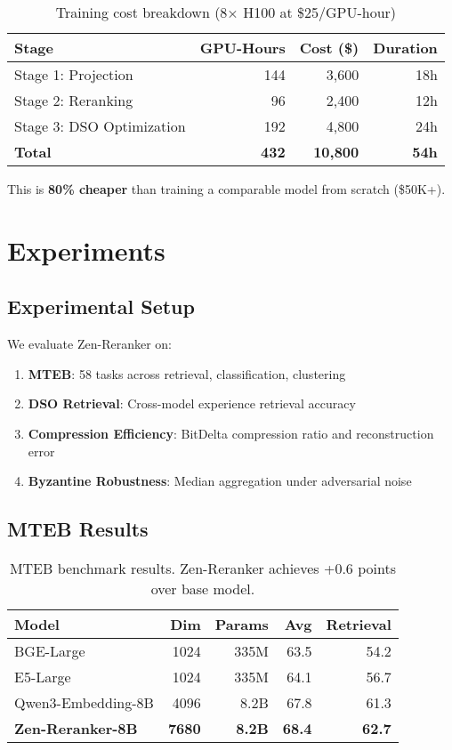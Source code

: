\documentclass[11pt,letterpaper]{article}
\begin{document}
\begin{table}[h]
\centering
\begin{tabular}{lrrr}
\toprule
\textbf{Stage} & \textbf{GPU-Hours} & \textbf{Cost (\$)} & \textbf{Duration} \\
\midrule
Stage 1: Projection & 144 & 3,600 & 18h \\
Stage 2: Reranking & 96 & 2,400 & 12h \\
Stage 3: DSO Optimization & 192 & 4,800 & 24h \\
\midrule
\textbf{Total} & \textbf{432} & \textbf{10,800} & \textbf{54h} \\
\bottomrule
\end{tabular}
\caption{Training cost breakdown (8× H100 at \$25/GPU-hour)}
\end{table}

This is \textbf{80\% cheaper} than training a comparable model from scratch (\$50K+).

\section{Experiments}

\subsection{Experimental Setup}

We evaluate Zen-Reranker on:
\begin{enumerate}
    \item \textbf{MTEB}: 58 tasks across retrieval, classification, clustering
    \item \textbf{DSO Retrieval}: Cross-model experience retrieval accuracy
    \item \textbf{Compression Efficiency}: BitDelta compression ratio and reconstruction error
    \item \textbf{Byzantine Robustness}: Median aggregation under adversarial noise
\end{enumerate}

\subsection{MTEB Results}

\begin{table}[h]
\centering
\begin{tabular}{lrrrr}
\toprule
\textbf{Model} & \textbf{Dim} & \textbf{Params} & \textbf{Avg} & \textbf{Retrieval} \\
\midrule
BGE-Large & 1024 & 335M & 63.5 & 54.2 \\
E5-Large & 1024 & 335M & 64.1 & 56.7 \\
Qwen3-Embedding-8B & 4096 & 8.2B & 67.8 & 61.3 \\
\textbf{Zen-Reranker-8B} & \textbf{7680} & \textbf{8.2B} & \textbf{68.4} & \textbf{62.7} \\
\bottomrule
\end{tabular}
\caption{MTEB benchmark results. Zen-Reranker achieves +0.6 points over base model.}
\end{table}
\end{document}
